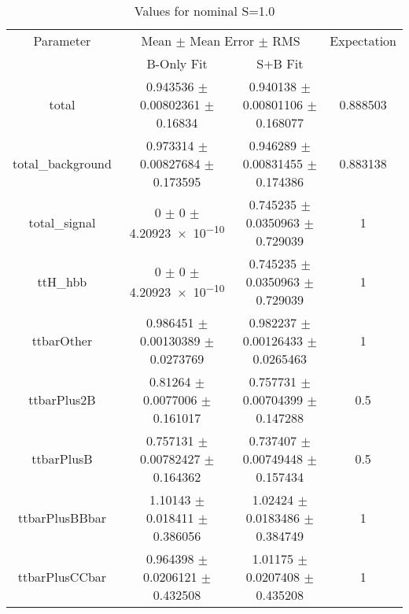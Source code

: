 \begin{table}
\centering
\caption{Values for nominal S=1.0}
\begin{tabular}{cccc}
\toprule
Parameter & \multicolumn{2}{c}{Mean $\pm$ Mean Error $\pm$ RMS} & Expectation\\
 & B-Only Fit & S+B Fit & \\
\midrule
total & \num{0.943536} $\pm$ \num{0.00802361} $\pm$ \num{0.16834} & \num{0.940138} $\pm$ \num{0.00801106} $\pm$ \num{0.168077} & \num{0.888503}\\
total\_background & \num{0.973314} $\pm$ \num{0.00827684} $\pm$ \num{0.173595} & \num{0.946289} $\pm$ \num{0.00831455} $\pm$ \num{0.174386} & \num{0.883138}\\
total\_signal & \num{0} $\pm$ \num{0} $\pm$ \num{4.20923e-10} & \num{0.745235} $\pm$ \num{0.0350963} $\pm$ \num{0.729039} & \num{1}\\
ttH\_hbb & \num{0} $\pm$ \num{0} $\pm$ \num{4.20923e-10} & \num{0.745235} $\pm$ \num{0.0350963} $\pm$ \num{0.729039} & \num{1}\\
ttbarOther & \num{0.986451} $\pm$ \num{0.00130389} $\pm$ \num{0.0273769} & \num{0.982237} $\pm$ \num{0.00126433} $\pm$ \num{0.0265463} & \num{1}\\
ttbarPlus2B & \num{0.81264} $\pm$ \num{0.0077006} $\pm$ \num{0.161017} & \num{0.757731} $\pm$ \num{0.00704399} $\pm$ \num{0.147288} & \num{0.5}\\
ttbarPlusB & \num{0.757131} $\pm$ \num{0.00782427} $\pm$ \num{0.164362} & \num{0.737407} $\pm$ \num{0.00749448} $\pm$ \num{0.157434} & \num{0.5}\\
ttbarPlusBBbar & \num{1.10143} $\pm$ \num{0.018411} $\pm$ \num{0.386056} & \num{1.02424} $\pm$ \num{0.0183486} $\pm$ \num{0.384749} & \num{1}\\
ttbarPlusCCbar & \num{0.964398} $\pm$ \num{0.0206121} $\pm$ \num{0.432508} & \num{1.01175} $\pm$ \num{0.0207408} $\pm$ \num{0.435208} & \num{1}\\
\bottomrule
\end{tabular}
\end{table}